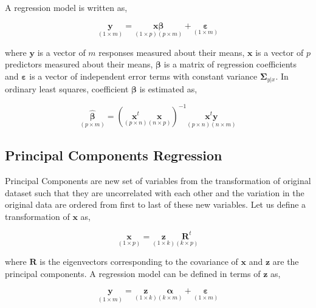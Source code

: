 \documentclass[12pt,3p,authoryear]{elsarticle}
\begin{document}
A regression model is written as,

\begin{equation}
\underset{(1\times m)}{\mathbf{y}} =
  \underset{(1\times p)(p\times m)}
    {\mathbf{x}\boldsymbol{\beta}} +
  \underset{(1 \times m)}{\boldsymbol{\varepsilon}}
\label{eq:reg-model}
\end{equation}

where \(\mathbf{y}\) is a vector of \(m\) responses measured about their
means, \(\mathbf{x}\) is a vector of \(p\) predictors measured about
their means, \(\boldsymbol{\beta}\) is a matrix of regression
coefficients and \(\boldsymbol{\varepsilon}\) is a vector of independent
error terms with constant variance \(\boldsymbol{\Sigma}_{y|x}\). In
ordinary least squares, coefficient \(\boldsymbol{\beta}\) is estimated
as,

\begin{equation}
\underset{(p\times m)}{\boldsymbol{\hat{\beta}}} =
  \left(\underset{(p\times n)}{\mathbf{x}^t}
  \underset{(n\times p)}{\mathbf{x}}\right)^{-1}
  \underset{(p \times n)(n \times m)}{\mathbf{x}^t\mathbf{y}}
\label{eq:reg-beta}
\end{equation}

\subsection{Principal Components
Regression}\label{principal-components-regression}

Principal Components are new set of variables from the transformation of
original dataset such that they are uncorrelated with each other and the
variation in the original data are ordered from first to last of these
new variables. Let us define a transformation of \(\mathbf{x}\) as,

\begin{equation}
\underset{(1\times p)}{\mathbf{x}} =
  \underset{(1 \times k)}{\mathbf{z}}
  \underset{(k \times p)}{\mathbf{R}^t}
\label{eq:x2z}
\end{equation}

where \(\mathbf{R}\) is the eigenvectors corresponding to the covariance
of \(\mathbf{x}\) and \(\mathbf{z}\) are the principal components. A
regression model can be defined in terms of \(\mathbf{z}\) as,

\begin{equation}
\underset{(1 \times m)}{\mathbf{y}} =
  \underset{(1 \times k)}{\mathbf{z}}
    \underset{(k \times m)}{\boldsymbol{\alpha}} +
  \underset{(1 \times m)}{\boldsymbol{\varepsilon}}
\label{eq:latent-model}
\end{equation}
\end{document}
